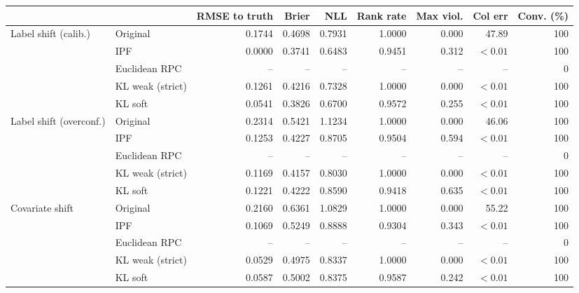 \begin{tabular}{llrrrrrrr}
\toprule
 &  & RMSE to truth & Brier & NLL & Rank rate & Max viol. & Col err & Conv. (\%) \\
\midrule
Label shift (calib.) & Original & 0.1744 & 0.4698 & 0.7931 & 1.0000 & 0.000 & 47.89 & 100 \\
 & IPF & 0.0000 & 0.3741 & 0.6483 & 0.9451 & 0.312 & $<0.01$ & 100 \\
 & Euclidean RPC & -- & -- & -- & -- & -- & -- & 0 \\
 & KL weak (strict) & 0.1261 & 0.4216 & 0.7328 & 1.0000 & 0.000 & $<0.01$ & 100 \\
 & KL soft & 0.0541 & 0.3826 & 0.6700 & 0.9572 & 0.255 & $<0.01$ & 100 \\
Label shift (overconf.) & Original & 0.2314 & 0.5421 & 1.1234 & 1.0000 & 0.000 & 46.06 & 100 \\
 & IPF & 0.1253 & 0.4227 & 0.8705 & 0.9504 & 0.594 & $<0.01$ & 100 \\
 & Euclidean RPC & -- & -- & -- & -- & -- & -- & 0 \\
 & KL weak (strict) & 0.1169 & 0.4157 & 0.8030 & 1.0000 & 0.000 & $<0.01$ & 100 \\
 & KL soft & 0.1221 & 0.4222 & 0.8590 & 0.9418 & 0.635 & $<0.01$ & 100 \\
Covariate shift & Original & 0.2160 & 0.6361 & 1.0829 & 1.0000 & 0.000 & 55.22 & 100 \\
 & IPF & 0.1069 & 0.5249 & 0.8888 & 0.9304 & 0.343 & $<0.01$ & 100 \\
 & Euclidean RPC & -- & -- & -- & -- & -- & -- & 0 \\
 & KL weak (strict) & 0.0529 & 0.4975 & 0.8337 & 1.0000 & 0.000 & $<0.01$ & 100 \\
 & KL soft & 0.0587 & 0.5002 & 0.8375 & 0.9587 & 0.242 & $<0.01$ & 100 \\
\bottomrule
\end{tabular}
